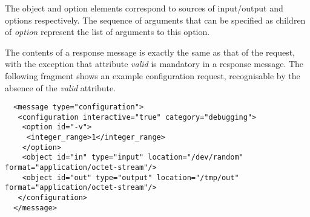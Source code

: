 \documentclass{article}
\begin{document}
   \noindent The object and option elements correspond to sources of
   input/output and options respectively. The sequence of arguments that can be
   specified as children of \textit{option} represent the list of arguments to
   this option.

   The contents of a response message is exactly the same as that of the
   request, with the exception that attribute \textit{valid} is mandatory in a
   response message. The following fragment shows an example configuration
   request, recognisable by the absence of the \textit{valid} attribute.

   \small \begin{verbatim}
  <message type="configuration">
   <configuration interactive="true" category="debugging">
    <option id="-v">
     <integer_range>1</integer_range>
    </option>
    <object id="in" type="input" location="/dev/random" format="application/octet-stream"/>
    <object id="out" type="output" location="/tmp/out" format="application/octet-stream"/>
   </configuration>
  </message>\end{verbatim}
  \normalsize


\end{document}
